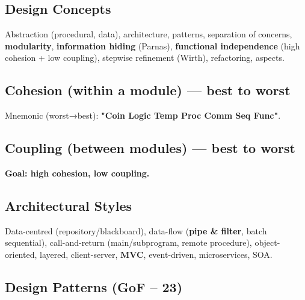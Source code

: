\needspace{161pt}

\hypertarget{p2-06--31-design-concepts}{%
\subsection{Design Concepts}\label{p2-06--31-design-concepts}}

Abstraction (procedural, data), architecture, patterns, separation of concerns, \textbf{modularity}, \textbf{information hiding} (Parnas), \textbf{functional independence} (high cohesion + low coupling), stepwise refinement (Wirth), refactoring, aspects.

\needspace{95pt}

\hypertarget{p2-06--32-cohesion-within-a-module--best-to-worst}{%
\subsection{Cohesion (within a module) --- best to worst}\label{p2-06--32-cohesion-within-a-module--best-to-worst}}



Mnemonic (worst→best): \textbf{"Coin Logic Temp Proc Comm Seq Func"}.

\needspace{95pt}

\hypertarget{p2-06--33-coupling-between-modules--best-to-worst}{%
\subsection{Coupling (between modules) --- best to worst}\label{p2-06--33-coupling-between-modules--best-to-worst}}



\textbf{Goal: high cohesion, low coupling.}

\needspace{196pt}

\hypertarget{p2-06--34-architectural-styles}{%
\subsection{Architectural Styles}\label{p2-06--34-architectural-styles}}

Data-centred (repository/blackboard), data-flow (\textbf{pipe \& filter}, batch sequential), call-and-return (main/subprogram, remote procedure), object-oriented, layered, client-server, \textbf{MVC}, event-driven, microservices, SOA.

\needspace{130pt}

\hypertarget{p2-06--35-design-patterns-gof--23}{%
\subsection{Design Patterns (GoF -- 23)}\label{p2-06--35-design-patterns-gof--23}}

